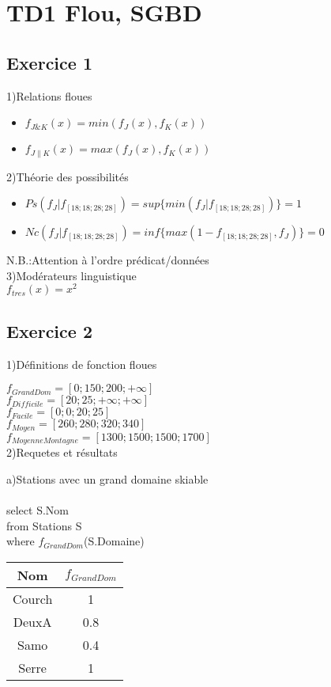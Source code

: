 \documentclass[10pt,a4paper]{report}
\begin{document}
\section*{TD1 Flou, SGBD}
\subsection*{Exercice 1}
1)Relations floues
\begin{itemize}
\item $f_{J\&K}(x)=min(f_J(x),f_K(x))$
\item $f_{J\|K}(x)=max(f_J(x),f_K(x))$
\end{itemize}

2)Théorie des possibilités
\begin{itemize}
\item $Ps(f_J|f_{[18;18;28;28]})=sup\{min(f_J|f_{[18;18;28;28]})\}=1$
\item $Nc(f_J|f_{[18;18;28;28]})=inf\{max(1-f_{[18;18;28;28]},f_J)\}=0$
\end{itemize}
N.B.:Attention à l'ordre prédicat/données\\

3)Modérateurs linguistique\\
$f_{tres}(x)=x^2 $
\subsection*{Exercice 2}

1)Définitions de fonction floues

$f_{GrandDom}=[0;150;200;+\infty]$\\
$f_{Difficile}=[20;25;+\infty;+\infty]$\\
$f_{Facile}=[0;0;20;25]$\\
$f_{Moyen}=[260;280;320;340]$\\
$f_{MoyenneMontagne}=[1300;1500;1500;1700]$\\

2)Requetes et résultats

a)Stations avec un grand domaine skiable\\\\
select S.Nom\\ 
from Stations S\\
where $f_{GrandDom}$(S.Domaine)\\

\begin{tabular}{|c|c|}
\hline 
Nom & $f_{GrandDom}$ \\ 
\hline 
Courch & 1 \\ 
\hline 
DeuxA & 0.8 \\ 
\hline 
Samo & 0.4 \\ 
\hline 
Serre & 1 \\ 
\hline 
\end{tabular} \\\\
\end{document}
